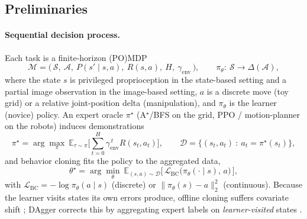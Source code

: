 \documentclass[letterpaper]{article} %
\begin{document}
\subsection{Preliminaries}

\paragraph{Sequential decision process.}
Each task is a finite-horizon (PO)MDP
\begin{equation}
\mathcal{M} = \big(\, \mathcal{S},\ \mathcal{A},\ P(s'\mid s,a),\ R(s,a),\ H,\ \gamma_{\mathrm{env}} \,\big),
\qquad
\pi_\theta:\ \mathcal{S}\to\Delta(\mathcal{A}),
\label{eq:mdp}
\end{equation}
where the state $s$ is privileged proprioception in the state-based setting and a
partial image observation in the image-based setting, $a$ is a discrete move (toy
grid) or a relative joint-position delta (manipulation), and $\pi_\theta$ is the
learner (novice) policy. An expert oracle $\pi^\star$ (A$^\star$/BFS on the grid,
PPO / motion-planner on the robots) induces demonstrations
\begin{equation}
\pi^\star=\arg\max_{\pi}\ \mathbb{E}_{\tau\sim\pi}\!\Big[\textstyle\sum_{t=0}^{H}\gamma_{\mathrm{env}}^{\,t} R(s_t,a_t)\Big],
\qquad
\mathcal{D}=\big\{(s_t,a_t)\ :\ a_t=\pi^\star(s_t)\big\},
\label{eq:expert}
\end{equation}
and behavior cloning fits the policy to the aggregated data,
\begin{equation}
\theta^\star=\arg\min_{\theta}\ \mathbb{E}_{(s,a)\sim\mathcal{D}}\big[\,\mathcal{L}_{\mathrm{BC}}\big(\pi_\theta(\cdot\mid s),\,a\big)\,\big],
\label{eq:bc}
\end{equation}
with $\mathcal{L}_{\mathrm{BC}}=-\log\pi_\theta(a\mid s)$ (discrete) or
$\|\pi_\theta(s)-a\|_2^2$ (continuous). Because the learner visits states its own
errors produce, offline cloning suffers covariate shift
\cite{pomerleau1988alvinn,pomerleau1991efficient}; DAgger corrects this by
aggregating expert labels on \emph{learner-visited} states
\cite{ross2011dagger,ross2014aggrevate,sun2017aggrevated}.
\end{document}
